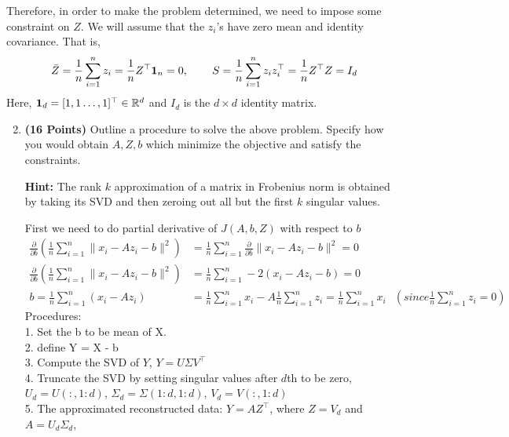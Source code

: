 \documentclass[a4paper]{article}
\newcommand{\Zbar}{\bar{Z}}
\theoremstyle{definition}
\newcommand{\RR}{\mathbb{R}}
\newenvironment{soln}{
    \leavevmode\color{blue}\ignorespaces
}{}
\begin{document}
Therefore, in order to make the problem determined, we need to impose some
constraint on $Z$. We will assume that the $z_i$'s have zero mean and identity covariance.
That is,
\begin{align*}
\Zbar = \frac{1}{n} \sum_{i=1}^n z_i =\frac{1}{n} Z^\top {\bf 1}_n = 0, \hspace{0.3in} 
S = \frac{1}{n} \sum_{i=1}^n z_i z_i^\top 
= \frac{1}{n} Z^\top Z
= I_d
\end{align*}
Here, ${\bf 1}_d = [1, 1 \dots, 1]^\top \in\RR^d$ and $I_d$  is the $d\times d$ identity matrix.

\begin{enumerate}
\setcounter{enumi}{1}
\item \textbf{(16 Points)}
Outline a procedure to solve the above problem. Specify how you
would obtain $A, Z, b$ which minimize the objective and satisfy the constraints.

\textbf{Hint: }The rank $k$ approximation of a matrix in Frobenius norm is obtained by
taking its SVD and then zeroing out all but the first $k$ singular values.

\begin{soln}
First we need to do partial derivative of $J(A,b,Z)$ with respect to $b$\\
\begin{align*}
    \frac{\partial}{\partial b} ( \frac{1}{n} \sum_{i = 1}^{n} \|x_i - Az_i - b\|^2 ) &= \frac{1}{n} \sum_{i = 1}^{n} \frac{\partial}{\partial b} \|x_i - Az_i - b\|^2  = 0\\
    \frac{\partial}{\partial b} ( \frac{1}{n} \sum_{i = 1}^{n} \|x_i - Az_i - b\|^2 ) &= \frac{1}{n} \sum_{i = 1}^{n} -2(x_i - Az_i - b) = 0\\
    b = \frac{1}{n} \sum_{i = 1}^{n} (x_i - Az_i) &= \frac{1}{n} \sum_{i = 1}^{n} x_i - A \frac{1}{n} \sum_{i = 1}^{n} z_i = \frac{1}{n} \sum_{i = 1}^{n} x_i \,\;\; (since \frac{1}{n} \sum_{i = 1}^{n} z_i = 0)
\end{align*}
Procedures:\\
1. Set the b to be mean of X.\\
2. define Y = X - b\\
3. Compute the SVD of $Y$, $Y = U \Sigma V^\top$\\
4. Truncate the SVD by setting singular values after $d$th to be zero, $U_d = U(:,1:d)$, $\Sigma_d = \Sigma(1:d,1:d)$, $V_d = V(:,1:d)$\\
5. The approximated reconstructed data: $Y = A Z^\top$, where $Z = V_d$ and $A = U_d \Sigma_d$,  \\


\end{soln}
\end{enumerate}
\end{document}
